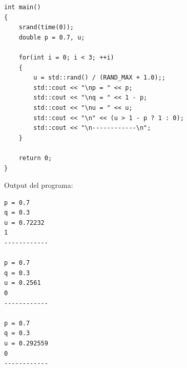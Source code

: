 \documentclass[a4paper, 12pt]{article}
\begin{document}
\begin{enumerate}
{\begin{lstlisting}
int main()
{
    srand(time(0));
    double p = 0.7, u;

    for(int i = 0; i < 3; ++i)
    {
        u = std::rand() / (RAND_MAX + 1.0);;
        std::cout << "\np = " << p;
        std::cout << "\nq = " << 1 - p;
        std::cout << "\nu = " << u;
        std::cout << "\n" << (u > 1 - p ? 1 : 0);
        std::cout << "\n------------\n";
    }

    return 0;
}
                \end{lstlisting}
                \Large Output del programa:
                \begin{lstlisting}
p = 0.7
q = 0.3
u = 0.72232
1
------------

p = 0.7
q = 0.3
u = 0.2561
0
------------

p = 0.7
q = 0.3
u = 0.292559
0
------------
               \end{lstlisting}
            }
    \end{enumerate}
\end{document}
